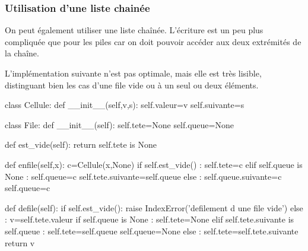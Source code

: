 \documentclass[11pt,a4paper,french,twoside]{PMCours}
\begin{document}
\newpage\noindent

\subsubsection{Utilisation d'une liste chainée}
On peut également utiliser une liste chaînée. L'écriture est un peu plus compliquée que pour les piles car on doit pouvoir accéder aux deux extrémités de la chaîne.

L'implémentation suivante n'est pas optimale, mais elle est très lisible, distinguant bien les cas d'une file vide ou à un seul ou deux éléments.

\begin{Python}
class Cellule:
    def __init__(self,v,s):
        self.valeur=v
        self.suivante=s
        
class File:
    def __init__(self):
        self.tete=None
        self.queue=None
            	
    def est_vide(self):
        return self.tete is None
    
	def enfile(self,x):
		c=Cellule(x,None)
		if self.est_vide() :
			self.tete=c
		elif self.queue is None :
			self.queue=c
			self.tete.suivante=self.queue
		else :
			self.queue.suivante=c
			self.queue=c
    
	def defile(self):
		if self.est_vide():
			raise IndexError('defilement d une file vide')
		else :
			v=self.tete.valeur
			if self.queue is None :
				self.tete=None
			elif self.tete.suivante is self.queue :
				self.tete=self.queue
				self.queue=None
			else :
				self.tete=self.tete.suivante						
			return v
\end{Python} %
 
\end{document}
